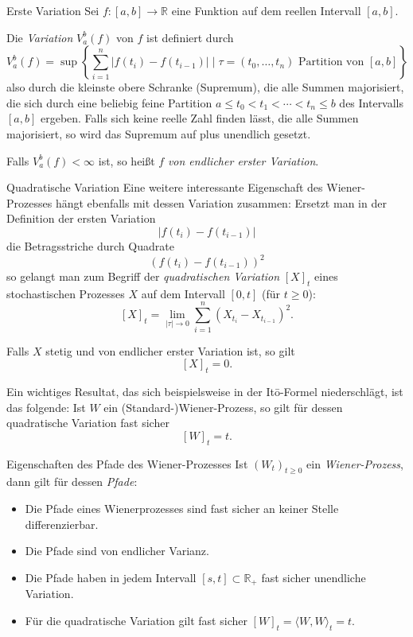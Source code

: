 \begin{defi}[Variation]{Erste Variation}
    Sei $f: [a,b]\to \mathbb{R}$ eine Funktion auf dem reellen Intervall $[a,b]$.

    Die \emph{Variation} $V_a^b(f)$ von $f$ ist definiert durch
    \[
        V_a^b(f) = \sup \left\{ \sum_{i=1}^{n} |f(t_{i})-f(t_{i-1})| \mid \tau = (t_{0},\dots ,t_{n}) \text{ Partition von } [a,b] \right\}
    \]
    also durch die kleinste obere Schranke (Supremum), die alle Summen majorisiert, die sich durch eine beliebig feine Partition $a \leq t_{0} < t_{1} < \dotsb < t_{n} \leq b$ des Intervalls $[a,b]$ ergeben.
    Falls sich keine reelle Zahl finden lässt, die alle Summen majorisiert, so wird das Supremum auf plus unendlich gesetzt.

    Falls $V_a^b(f) < \infty$ ist, so heißt $f$ \emph{von endlicher erster Variation}.
\end{defi}

\begin{defi}[Variation]{Quadratische Variation}
    Eine weitere interessante Eigenschaft des Wiener-Prozesses hängt ebenfalls mit dessen Variation zusammen:
    Ersetzt man in der Definition der ersten Variation
    \[
        |f(t_{i})-f(t_{i-1})|
    \]
    die Betragsstriche durch Quadrate
    \[
        ( f(t_{i})-f(t_{i-1}) )^{2}
    \]
    so gelangt man zum Begriff der \emph{quadratischen Variation} $[X]_{t}$ eines stochastischen Prozesses $X$ auf dem Intervall $[0,t]$ (für $t\geq 0$):
    \[
        [X]_{t} = \lim_{|\tau |\to 0} \sum_{i=1}^{n} (X_{t_{i}}-X_{t_{i-1}})^{2}.
    \]

    Falls $X$ stetig und von endlicher erster Variation ist, so gilt
    \[
        [X]_{t} = 0.
    \]

    Ein wichtiges Resultat, das sich beispielsweise in der Itō-Formel niederschlägt, ist das folgende:
    Ist $W$ ein (Standard-)Wiener-Prozess, so gilt für dessen quadratische Variation fast sicher
    \[
        [W]_{t} = t.
    \]
\end{defi}

\begin{defi}{Eigenschaften des Pfade des Wiener-Prozesses}
    Ist $(W_{t})_{t \geq 0}$ ein \emph{Wiener-Prozess}, dann gilt für dessen \emph{Pfade}:
    \begin{itemize}
        \item Die Pfade eines Wienerprozesses sind fast sicher an keiner Stelle differenzierbar.
        \item Die Pfade sind von endlicher Varianz.
        \item Die Pfade haben in jedem Intervall $[s,t]\subset \mathbb{R}_{+}$ fast sicher unendliche Variation.
        \item Für die quadratische Variation gilt fast sicher $[W]_{t}=\langle W,W\rangle_{t}=t$.
    \end{itemize}
\end{defi}

